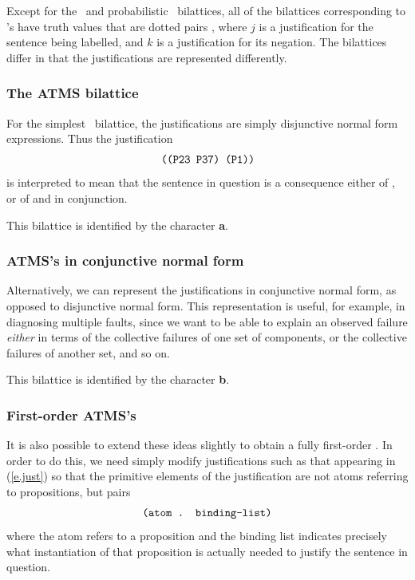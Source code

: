 Except for the \nm\ and probabilistic \atms\ bilattices, all of the
bilattices corresponding to \atms's have truth values that are dotted
pairs , where $j$ is a justification for the sentence
being labelled, and $k$ is a justification for its negation.  The
bilattices differ in that the justifications are represented
differently.

\subsubsection{The ATMS bilattice}

For the simplest \atms\ bilattice, the justifications are simply
disjunctive normal form expressions.  Thus the justification
 \begin{equation}
\mbox{\tt ((P23 P37) (P1))}
\label{e.just}
\end{equation}
 is interpreted to mean that the sentence in question is a
consequence either of , or of  and  in
conjunction.

This bilattice is identified by the character {\bf a}.

\subsubsection{ATMS's in conjunctive normal form}

Alternatively, we can represent the justifications in conjunctive
normal form, as opposed to disjunctive normal form.  This representation
is useful, for example, in diagnosing multiple faults, since we want to
be able to explain an observed failure {\em either\/} in terms of the
collective failures of one set of components, or the collective failures
of another set, and so on.

This bilattice is identified by the character {\bf b}.

\subsubsection{First-order ATMS's}
\label{s.fo-atms}

It is also possible to extend these ideas slightly to obtain a fully
first-order \atms.  In order to do this, we need simply modify
justifications such as that appearing in (\ref{e.just}) so that the
primitive elements of the justification are not atoms referring to
propositions, but pairs
 \[\mbox{\tt (atom . binding-list)}\]
 where the atom refers to a proposition and the binding list
indicates precisely what instantiation of that proposition is
actually needed to justify the sentence in question.

